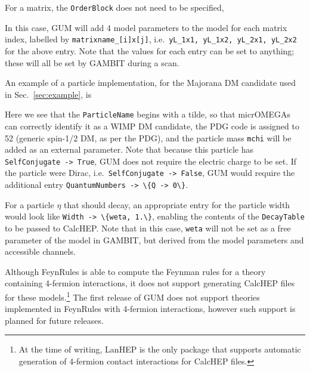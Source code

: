 \documentclass[pdftex,twocolumn,epjc3_preprint,runningheads]{svjour3}
\renewcommand{\_}{\discretionary{\underscore}{}{\underscore}}
\newcommand\cpp[1]{{\lstinline!#1!}}  %
\newcommand\mathematica[1]{{\lstset{style=Mathematica}\lstinline!#1!\lstset{style=cpp}}}
\newcommand\textinline[1]{{{\lstset{style=text}\lstinline!#1!}}}
\newcommand{\ie}{i.e.\ }
\newcommand{\gambit}{\textsf{GAMBIT}\xspace}
\newcommand{\GB}{\gambit}
\newcommand{\mo}{\micromegas}
\newcommand{\micromegas}{\textsf{micrOMEGAs}\xspace}
\newcommand{\gum}{\textsf{GUM}\xspace}
\newcommand{\fr}{\textsf{FeynRules}\xspace}
\newcommand{\CH}{\textsf{CalcHEP}\xspace}
\begin{document}
For a matrix, the \mathematica{OrderBlock} does not need to be specified,
%
\begin{lstmathematica}
M$Parameters = {
  ...
  yL == {
    ParameterType    -> External,
    ComplexParameter -> False,
    InteractionOrder -> {BSM, 1},
    Indices          -> {Index[Generation],
                         Index[Generation]},
    BlockName        -> yL,
    Value            -> {yL[1,1]->1, yL[1,2]->0,
                         yL[2,1]->0, yL[2,2]->1},
    TeX              -> Subscript[y,L],
    InteractionOrder -> {NP, 1},
    Description      -> "Left-handed matrix"
  },
  ...
\end{lstmathematica}

In this case, \gum will add 4 model parameters to the model for each matrix index, labelled by \textinline{matrixname_[i]x[j]}, \ie \textinline{yL_1x1, yL_1x2, yL_2x1, yL_2x2} for the above entry. Note that the values for each entry can be set to anything; these will all be set by \GB during a scan.

An example of a particle implementation, for the Majorana DM candidate used in Sec.~\ref{sec:example}, is
%
\begin{lstmathematica}
M$ClassesDescription = {
  ...
  F[5] == {
    ClassName        -> chi,
    SelfConjugate    -> True,
    Mass             -> {mchi, 1000.},
    Width            -> 0.,
    PDG              -> 52,
    ParticleName     -> "~chi",
  },
  ...
\end{lstmathematica}
%
Here we see that the \mathematica{ParticleName} begins with a tilde, so that \mo can correctly identify it as a WIMP DM candidate, the PDG code is assigned to 52 (generic spin-1/2 DM, as per the PDG), and the particle mass \mathematica{mchi} will be added as an external parameter. Note that because this particle has \mathematica{SelfConjugate -> True}, \gum does not require the electric charge to be set. If the particle were Dirac, \ie \mathematica{SelfConjugate -> False}, \gum would require the additional entry \mathematica{QuantumNumbers -> \{Q -> 0\}}.

For a particle $\eta$ that should decay, an appropriate entry for the particle width would look like \mathematica{Width -> \{weta, 1.\}}, enabling the contents of the \cpp{DecayTable} to be passed to \CH. Note that in this case, \mathematica{weta} will not be set as a free parameter of the model in \GB, but derived from the model parameters and accessible channels.

Although \fr is able to compute the Feynman rules for a theory containing 4-fermion interactions, it does not support generating \CH files for these models.\footnote{At the time of writing, \textsf{LanHEP} is the only package that supports automatic generation of 4-fermion contact interactions for \CH files.} The first release of \gum does not support theories implemented in \fr with 4-fermion interactions, however such support is planned for future releases.
\end{document}
